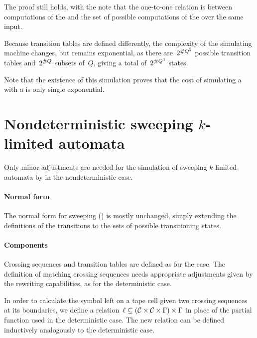 The proof still holds, with the note that the one-to-one relation is between computations of the \ODFA and the set of possible computations of the \TNFA over the same input.

Because transition tables are defined differently, the complexity of the simulating machine changes, but remains exponential, as there are~$2^{\# Q^2}$ possible transition tables and~$2^{\# Q}$ subsets of~$Q$, giving a total of~$2^{\# Q^3}$ states.

Note that the existence of this simulation proves that the cost of simulating a \TNFA with a \ODFA is only single exponential.



\section[Nondeterministic sweeping \texorpdfstring{\kLAs}{k-LAs}]{Nondeterministic sweeping $k$-limited automata}\label{sec:nondet-sweeping}
Only minor adjustments are needed for the simulation of sweeping $k$-limited automata by \ONFAs in the nondeterministic case.


\paragraph{Normal form} The normal form for sweeping \kLAs () is mostly unchanged, simply extending the definitions of the transitions to the sets of possible transitioning states.

\paragraph{Components} Crossing sequences and transition tables are defined as for the \TNFA case. The definition of matching crossing sequences needs appropriate adjustments given by the rewriting capabilities, as for the deterministic case.

In order to calculate the symbol left on a tape cell given two crossing sequences at its boundaries, we define a relation~$\ell\subseteq(\mathcal C\times\mathcal C\times\Gamma)\times\Gamma$ in place of the partial function used in the deterministic case.
The new relation can be defined inductively analogously to the deterministic case.

